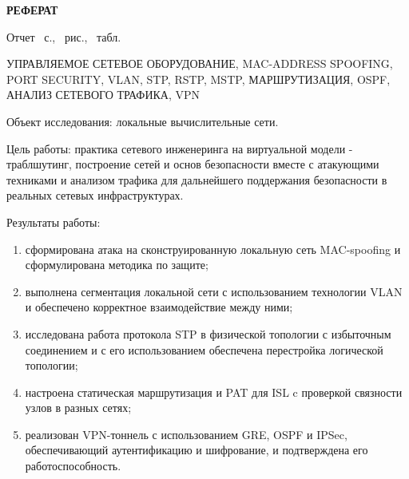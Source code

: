 \begin{center}
  \textbf{РЕФЕРАТ}

  \vspace{20pt}

  \justifying
    Отчет \ztotpages\ с., 
    \totalfigures\ рис., 
    \totaltables\ табл.

    \noindent \MakeUppercase{Управляемое сетевое оборудование, MAC-address Spoofing, Port Security, VLAN, STP, RSTP, MSTP, маршрутизация, OSPF, анализ сетевого трафика, VPN}
 
    Объект исследования: локальные вычислительные сети.

    Цель работы: практика сетевого инженеринга на виртуальной модели - траблшутинг, построение сетей и основ безопасности вместе с атакующими техниками и анализом трафика для дальнейшего поддержания безопасности в реальных сетевых инфраструктурах.

    Результаты работы:
    \begin{enumerate}
        \item сформирована атака на сконструированную локальную сеть MAC-spoofing и сформулирована методика по защите;
        \item выполнена сегментация локальной сети с использованием технологии VLAN и обеспечено корректное взаимодействие между ними;
        \item исследована работа протокола STP в физической топологии с избыточным соединением и с его использованием обеспечена перестройка логической топологии;
        \item настроена статическая маршрутизация и PAT для ISL c проверкой связности узлов в разных сетях;
        \item реализован VPN-тоннель с использованием GRE, OSPF и IPSec, обеспечивающий аутентификацию и шифрование, и подтверждена его работоспособность.
    \end{enumerate}
    
  \vspace{20pt}
\end{center}

